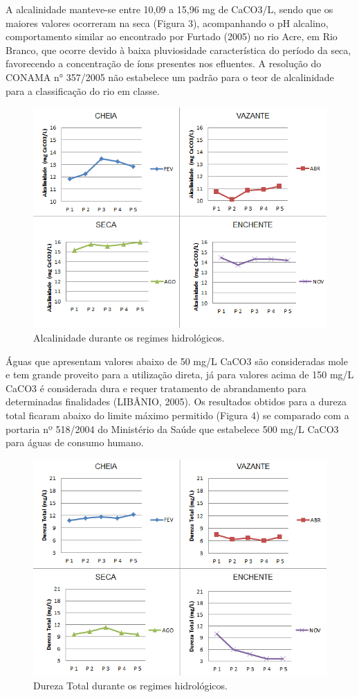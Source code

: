 \documentclass[article,12pt,onesidea,4paper,english,brazil]{abntex2}
\begin{document}
A alcalinidade manteve-se entre 10,09 a 15,96 mg de CaCO3/L, sendo que os maiores valores ocorreram na seca (Figura 3), acompanhando o pH alcalino, comportamento similar ao encontrado por Furtado (2005) no rio Acre, em Rio Branco, que ocorre devido à baixa pluviosidade característica do período da seca, favorecendo a concentração de íons presentes nos efluentes. A resolução do CONAMA n° 357/2005 não estabelece um padrão para o teor de alcalinidade para a classificação do rio em classe.

	\begin{figure}[!h]
	\centering
	\includegraphics[width=0.8\linewidth]{pip-137-03}
	\caption{Alcalinidade durante os regimes hidrológicos.}
	\end{figure}

Águas que apresentam valores abaixo de 50 mg/L CaCO3 são consideradas mole e tem grande proveito para a utilização direta, já para valores acima de 150 mg/L CaCO3 é considerada dura e requer tratamento de abrandamento para determinadas finalidades (LIBÂNIO, 2005). Os resultados obtidos para a dureza total ficaram abaixo do limite máximo permitido (Figura 4) se comparado com a portaria nº 518/2004 do Ministério da Saúde que estabelece 500 mg/L CaCO3 para águas de consumo humano.

\begin{figure}[!h]
	\centering
	\includegraphics[width=0.8\linewidth]{pip-137-04}
	\caption{Dureza Total durante os regimes hidrológicos.}
\end{figure}
\end{document}
